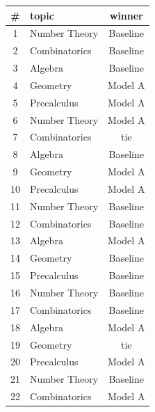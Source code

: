 \documentclass[11pt]{article}
\begin{document}
\begin{tabular}{clc}

\# & topic & winner \\ \hline

1 & Number Theory & Baseline \\

2 & Combinatorics & Baseline \\

3 & Algebra & Baseline \\

4 & Geometry & Model A \\

5 & Precalculus & Model A \\

6 & Number Theory & Model A \\

7 & Combinatorics & tie \\

8 & Algebra & Baseline \\

9 & Geometry & Model A \\

10 & Precalculus & Model A \\

11 & Number Theory & Baseline \\

12 & Combinatorics & Baseline \\

13 & Algebra & Model A \\

14 & Geometry & Baseline \\

15 & Precalculus & Baseline \\

16 & Number Theory & Baseline \\

17 & Combinatorics & Baseline \\

18 & Algebra & Model A \\

19 & Geometry & tie \\

20 & Precalculus & Model A \\

21 & Number Theory & Baseline \\

22 & Combinatorics & Model A \\


\end{tabular}
\end{document}
